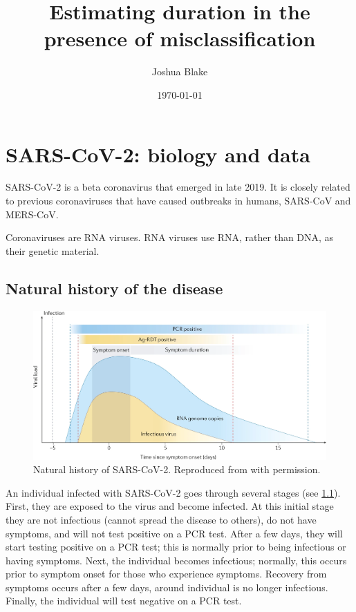 \documentclass[thesis.tex]{subfiles}
\title{Estimating duration in the presence of misclassification}
\author{Joshua Blake}
\date{\today}
\begin{document}
\ifSubfilesClassLoaded{
  \setcounter{chapter}{1}
}

\chapter{SARS-CoV-2: biology and data} \label{biology-data}

SARS-CoV-2 is a beta coronavirus that emerged in late 2019.
It is closely related to previous coronaviruses that have caused outbreaks in humans, SARS-CoV and MERS-CoV.

Coronaviruses are RNA viruses.
RNA viruses use RNA, rather than DNA, as their genetic material.

\section{Natural history of the disease} \label{biology-data:sec:natural-history}

\begin{figure}
  \centering\includegraphics[width=\textwidth]{biology-data/natural-history}
  \caption[Natural history of SARS-CoV-2.]{Natural history of SARS-CoV-2. Reproduced from \textcite{puhachSARSCoV2} with permission.}
  \label{biology-data:fig:natural-history}
\end{figure}

An individual infected with SARS-CoV-2 goes through several stages (see \cref{biology-data:fig:natural-history}).
First, they are exposed to the virus and become infected.
At this initial stage they are not infectious (cannot spread the disease to others), do not have symptoms, and will not test positive on a PCR test.
After a few days, they will start testing positive on a PCR test; this is normally prior to being infectious or having symptoms.
Next, the individual becomes infectious; normally, this occurs prior to symptom onset for those who experience symptoms.
Recovery from symptoms occurs after a few days, around individual is no longer infectious.
Finally, the individual will test negative on a PCR test.
\end{document}
